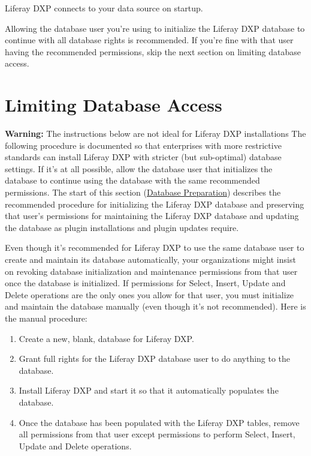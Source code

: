 Liferay DXP connects to your data source on startup.

Allowing the database user you're using to initialize the Liferay DXP
database to continue with all database rights is recommended. If you're
fine with that user having the recommended permissions, skip the next
section on limiting database access.

\section{Limiting Database Access}\label{limiting-database-access}

\noindent\hrulefill

\textbf{Warning:} The instructions below are not ideal for Liferay DXP
installations The following procedure is documented so that enterprises
with more restrictive standards can install Liferay DXP with stricter
(but sub-optimal) database settings. If it's at all possible, allow the
database user that initializes the database to continue using the
database with the same recommended permissions. The start of this
section (\hyperref[preparing-a-database]{Database Preparation})
describes the recommended procedure for initializing the Liferay DXP
database and preserving that user's permissions for maintaining the
Liferay DXP database and updating the database as plugin installations
and plugin updates require.

\noindent\hrulefill

Even though it's recommended for Liferay DXP to use the same database
user to create and maintain its database automatically, your
organizations might insist on revoking database initialization and
maintenance permissions from that user once the database is initialized.
If permissions for Select, Insert, Update and Delete operations are the
only ones you allow for that user, you must initialize and maintain the
database manually (even though it's not recommended). Here is the manual
procedure:

\begin{enumerate}
\def\labelenumi{\arabic{enumi}.}
\item
  Create a new, blank, database for Liferay DXP.
\item
  Grant full rights for the Liferay DXP database user to do anything to
  the database.
\item
  Install Liferay DXP and start it so that it automatically populates
  the database.
\item
  Once the database has been populated with the Liferay DXP tables,
  remove all permissions from that user except permissions to perform
  Select, Insert, Update and Delete operations.
\end{enumerate}

